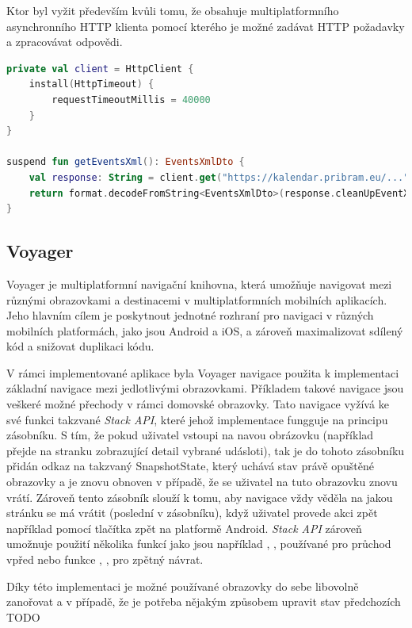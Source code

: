Ktor byl vyžit především kvůli tomu, že obsahuje multiplatformního asynchronního HTTP klienta pomocí kterého je možné zadávat HTTP požadavky a 
zpracovávat odpovědi. 

\begin{lstlisting}[caption={Definice barevných motivů}, label={lst:colorsDef}, language=Kotlin]
  private val client = HttpClient {
    install(HttpTimeout) {
        requestTimeoutMillis = 40000
    }
}

suspend fun getEventsXml(): EventsXmlDto {
    val response: String = client.get("https://kalendar.pribram.eu/...").body()
    return format.decodeFromString<EventsXmlDto>(response.cleanUpEventXml())
}
\end{lstlisting}

\subsection{Voyager}
Voyager je multiplatformní navigační knihovna, která umožňuje navigovat mezi různými obrazovkami a destinacemi v multiplatformních mobilních
 aplikacích. \cite{voyager} Jeho hlavním cílem je poskytnout jednotné rozhraní pro navigaci v různých mobilních platformách, jako jsou Android a iOS, a 
 zároveň maximalizovat sdílený kód a snižovat duplikaci kódu.

 V rámci implementované aplikace byla Voyager navigace použita k implementaci základní navigace mezi jedlotlivými obrazovkami.
 Příkladem takové navigace jsou veškeré možné přechody v rámci domovské obrazovky. Tato navigace vyžívá ke své funkci takzvané 
 \textit{Stack API}, které jehož implementace fungguje na principu zásobníku. S tím, že pokud uživatel vstoupi na navou obrázovku 
 (například přejde na stranku zobrazující detail vybrané udásloti), tak je do tohoto zásobníku přidán odkaz na takzvaný SnapshotState,
 který uchává stav právě opuštěné obrazovky a je znovu obnoven v případě, že se uživatel na tuto obrazovku znovu vrátí. Zároveň tento
 zásobník slouží k tomu, aby navigace vždy věděla na jakou stránku se má vrátit (poslední v zásobníku), když uživatel provede akci zpět
 například pomocí tlačítka zpět na platformě Android. \textit{Stack API} zároveň umožnuje použití několika funkcí jako jsou například 
 , ,  používané pro průchod vpřed nebo funkce , , 
  pro zpětný návrat. 

 Díky této implementaci je možné používané obrazovky do sebe libovolně zanořovat a v případě, že je potřeba nějakým způsobem upravit
 stav předchozích TODO

